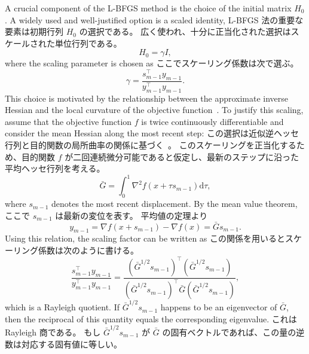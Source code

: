 \documentclass[0_main]{subfiles}
\begin{document}
\ifEn
    A crucial component of the L-BFGS method is the choice of the initial matrix $H_0$.
    A widely used and well-justified option is a scaled identity,
\else
    L-BFGS 法の重要な要素は初期行列 $H_0$ の選択である。
    広く使われ、十分に正当化された選択はスケールされた単位行列である。
\fi
\begin{equation*}
    H_0 = \gamma I,
\end{equation*}
\ifEn
    where the scaling parameter is chosen as
\else
    ここでスケーリング係数は次で選ぶ。
\fi
\begin{equation*}
    \gamma = \frac{s_{m-1}^\top y_{m-1}}{y_{m-1}^\top y_{m-1}}.
\end{equation*}
\ifEn
    This choice is motivated by the relationship between the approximate inverse Hessian and the local curvature of the objective function~\citep{liuLimitedMemoryBFGS1989a,shannoMatrixConditioningNonlinear1978}.
    To justify this scaling, assume that the objective function $f$ is twice continuously differentiable and consider the mean Hessian along the most recent step:
\else
    この選択は近似逆ヘッセ行列と目的関数の局所曲率の関係に基づく~\citep{liuLimitedMemoryBFGS1989a,shannoMatrixConditioningNonlinear1978}。
    このスケーリングを正当化するため、目的関数 $f$ が二回連続微分可能であると仮定し、最新のステップに沿った平均ヘッセ行列を考える。
\fi
\begin{equation*}
    \bar{G} = \int_0^1 \nabla^2 f(x + \tau s_{m-1}) \mathrm{d}\tau,
\end{equation*}
\ifEn
    where $s_{m-1}$ denotes the most recent displacement.
    By the mean value theorem,
\else
    ここで $s_{m-1}$ は最新の変位を表す。
    平均値の定理より
\fi
\begin{equation*}
    y_{m-1}
    =
    \nabla f(x+s_{m-1}) - \nabla f(x)
    =
    \bar{G} s_{m-1}.
\end{equation*}
\ifEn
    Using this relation, the scaling factor can be written as
\else
    この関係を用いるとスケーリング係数は次のように書ける。
\fi
\begin{equation*}
    \frac{s_{m-1}^\top y_{m-1}}{y_{m-1}^\top y_{m-1}}
    =
    \frac{(\bar{G}^{1/2} s_{m-1})^\top (\bar{G}^{1/2} s_{m-1})}
    {(\bar{G}^{1/2} s_{m-1})^\top \bar{G} (\bar{G}^{1/2} s_{m-1})},
\end{equation*}
\ifEn
    which is a Rayleigh quotient.
    If $\bar{G}^{1/2} s_{m-1}$ happens to be an eigenvector of $\bar{G}$, then the reciprocal of this quantity equals the corresponding eigenvalue.
\else
    これは Rayleigh 商である。
    もし $\bar{G}^{1/2} s_{m-1}$ が $\bar{G}$ の固有ベクトルであれば、この量の逆数は対応する固有値に等しい。
\fi
\end{document}
